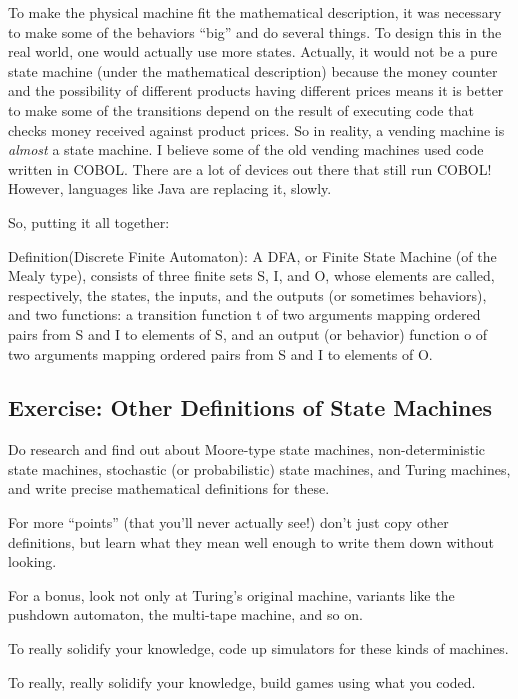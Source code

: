 To make the physical machine fit the mathematical description, it was
necessary to make some of the behaviors ``big'' and do several things.
To design this in the real world, one would actually use more states.
Actually, it would not be a pure state machine (under the mathematical
description) because the money counter and the possibility of different
products having different prices means it is better to make some of the
transitions depend on the result of executing code that checks money
received against product prices. So in reality, a vending machine is
\emph{almost} a state machine. I believe some of the old vending
machines used code written in COBOL. There are a lot of devices out
there that still run COBOL! However, languages like Java are replacing
it, slowly.

So, putting it all together:

Definition(Discrete Finite Automaton): A DFA, or Finite State Machine
(of the Mealy type), consists of three finite sets S, I, and O, whose
elements are called, respectively, the states, the inputs, and the
outputs (or sometimes behaviors), and two functions: a transition
function t of two arguments mapping ordered pairs from S and I to
elements of S, and an output (or behavior) function o of two arguments
mapping ordered pairs from S and I to elements of O.

\subsection[Exercise: Other Definitions of State
Machines]{\texorpdfstring{\protect\hypertarget{anchor-23}{}{}Exercise:
Other Definitions of State
Machines}{Exercise: Other Definitions of State Machines}}\label{exercise-other-definitions-of-state-machines}

Do research and find out about Moore-type state machines,
non-deterministic state machines, stochastic (or probabilistic) state
machines, and Turing machines, and write precise mathematical
definitions for these.

For more ``points'' (that you'll never actually see!) don't just copy
other definitions, but learn what they mean well enough to write them
down without looking.

For a bonus, look not only at Turing's original machine, variants like
the pushdown automaton, the multi-tape machine, and so on.

To really solidify your knowledge, code up simulators for these kinds of
machines.

To really, really solidify your knowledge, build games using what you
coded.

